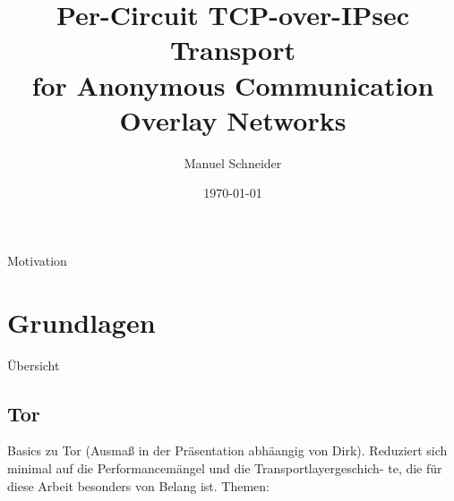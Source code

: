 \documentclass{beamer}
\begin{document}
\title{Per-Circuit TCP-over-IPsec Transport\\for Anonymous Communication Overlay Networks}   
\author{Manuel Schneider}
\date{\today} 

\begin{frame}[plain]
\titlepage
\end{frame}

\begin{frame}{Motivation}
\end{frame}

\section{Grundlagen}

\begin{frame}{Übersicht}
\tableofcontents[sectionstyle=show/shaded, subsectionstyle=show/hide/hide]
\end{frame}

\subsection{Tor}

\begin{frame}{\subsecname}{\secname}
Basics zu Tor (Ausmaß in der Präsentation abhäangig von Dirk).
Reduziert sich minimal auf die Performancemängel und die Transportlayergeschich-
te, die für diese Arbeit besonders von Belang ist.
Themen:
\end{frame}

\end{document}
